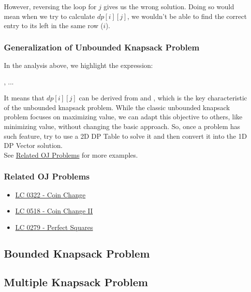 However, reversing the loop for $j$ gives us the wrong solution. Doing so would mean when we try to calculate $dp[i][j]$, we wouldn't be able to find the correct entry to its left in the same row ($i$).

\subsubsection{Generalization of Unbounded Knapsack Problem}
In the analysis above, we highlight the expression:
\begin{center}
{\color{ForestGreen}{For each item $i$, we can choose to either put it into the knapsack or not}}, ...
\end{center}
It means that $dp[i][j]$ can be derived from {\color{blue}{$dp[i-1][j]$ (doesn't put item $i$ into the knapsack)}} and {\color{blue}{$dp[i][j-w_{i-1}]$ (put the item $i$ into the knapsack)}}, which is the key characteristic of the unbounded knapsack problem. While the classic unbounded knapsack problem focuses on maximizing value, we can adapt this objective to others, like minimizing value, without changing the basic approach. So, once a problem has such feature, try to use a 2D DP Table to solve it and then convert it into the 1D DP Vector solution. \\

See \hyperref[subsubsec:unbounded_knapsack_oj_problems]{Related OJ Problems} for more examples.

\subsubsection{Related OJ Problems}\label{subsubsec:unbounded_knapsack_oj_problems}
\begin{itemize}
\item \hyperref[lc0322]{LC 0322 - Coin Change}
\item \hyperref[lc0518]{LC 0518 - Coin Change II}
\item \hyperref[lc0279]{LC 0279 - Perfect Squares}
\end{itemize}

\subsection{Bounded Knapsack Problem}

\subsection{Multiple Knapsack Problem}

